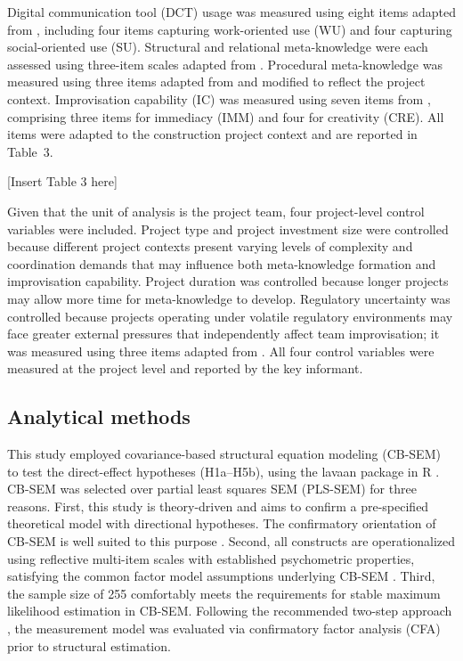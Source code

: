 \documentclass[authoryear,preprint,review,times,10pt]{elsarticle}
\begin{document}
Digital communication tool (DCT) usage was measured using eight items adapted from \citet{chen2020Integrating}, including four items capturing work-oriented use (WU) and four capturing social-oriented use (SU). Structural and relational meta-knowledge were each assessed using three-item scales adapted from \citet{engelbrecht2019How}. Procedural meta-knowledge was measured using three items adapted from \citet{faraj2000Coordinating} and modified to reflect the project context.  Improvisation capability (IC) was measured using seven items from \citet{magni2009Role}, comprising three items for immediacy (IMM) and four for creativity (CRE). All items were adapted to the construction project context and are reported in Table~3.

\begin{center}[Insert Table 3 here]\end{center}

Given that the unit of analysis is the project team, four project-level control variables were included. Project type and project investment size were controlled because different project contexts present varying levels of complexity and coordination demands that may influence both meta-knowledge formation and improvisation capability. Project duration was controlled because longer projects may allow more time for meta-knowledge to develop. Regulatory uncertainty was controlled because projects operating under volatile regulatory environments may face greater external pressures that independently affect team improvisation; it was measured using three items adapted from \citet{wang2016Governing}. All four control variables were measured at the project level and reported by the key informant.

\subsection{Analytical methods}
This study employed covariance-based structural equation modeling (CB-SEM) to test the direct-effect hypotheses (H1a--H5b), using the lavaan package in R \citep{rosseel2012Lavaan}. CB-SEM was selected over partial least squares SEM (PLS-SEM) for three reasons. First, this study is theory-driven and aims to confirm a pre-specified theoretical model with directional hypotheses. The confirmatory orientation of CB-SEM is well suited to this purpose \citep{anderson1988Structural, hair2019Multivariate}. Second, all constructs are operationalized using reflective multi-item scales with established psychometric properties, satisfying the common factor model assumptions underlying CB-SEM \citep{pesamaa2021Publishing}. Third, the sample size of 255 comfortably meets the requirements for stable maximum likelihood estimation in CB-SEM. Following the recommended two-step approach \citep{anderson1988Structural}, the measurement model was evaluated via confirmatory factor analysis (CFA) prior to structural estimation.
\end{document}
